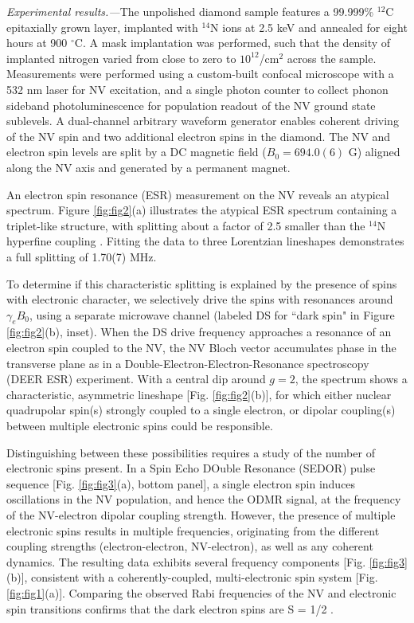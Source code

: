 \documentclass[%
 reprint,
 amsmath,amssymb,
 aps,
]{revtex4-1}
\begin{document}
\textit{Experimental results.---}The unpolished diamond sample features a 99.999\% $^{12}$C epitaxially grown layer, implanted with $^{14}$N ions at 2.5 keV and annealed for eight hours at 900 $^\circ$C. A mask implantation was performed, such that the density of implanted nitrogen varied from close to zero to $10^{12}$/cm$^2$ across the sample. Measurements were performed using a custom-built confocal microscope with a 532 nm laser for NV excitation, and a single photon counter to collect phonon sideband photoluminescence for population readout of the NV ground state sublevels. A dual-channel arbitrary waveform generator enables coherent driving of the NV spin and two additional electron spins in the diamond. The NV and electron spin levels are split by a DC magnetic field ($B_0=694.0(6)$ G) aligned along the NV axis and generated by a permanent magnet. 

An electron spin resonance (ESR) measurement on the NV reveals an atypical spectrum. Figure \ref{fig:fig2}(a) illustrates the atypical ESR spectrum containing a triplet-like structure, with splitting about a factor of 2.5 smaller than the $^{14}$N hyperfine coupling \cite{newton nv hyp}. Fitting the data to three Lorentzian lineshapes demonstrates a full splitting of 1.70(7) MHz. 

To determine if this characteristic splitting is explained by the presence of spins with electronic character, we selectively drive the spins with resonances around $\gamma_eB_0$, using a separate microwave channel (labeled DS for ``dark spin" in Figure \ref{fig:fig2}(b), inset). When the DS drive frequency approaches a resonance of an electron spin coupled to the NV, the NV Bloch vector accumulates phase in the transverse plane as in a Double-Electron-Electron-Resonance spectroscopy (DEER ESR) experiment. With a central dip around $g=2$, the spectrum shows a characteristic, asymmetric lineshape [Fig. \ref{fig:fig2}(b)], for which either nuclear quadrupolar spin(s) strongly coupled to a single electron, or dipolar coupling(s) between multiple electronic spins could be responsible. 

Distinguishing between these possibilities requires a study of the number of electronic spins present. In a Spin Echo DOuble Resonance (SEDOR) pulse sequence \cite{schweiger} [Fig. \ref{fig:fig3}(a), bottom panel], a single electron spin induces oscillations in the NV population, and hence the ODMR signal, at the frequency of the NV-electron dipolar coupling strength. However, the presence of multiple electronic spins results in multiple frequencies, originating from the different coupling strengths (electron-electron, NV-electron), as well as any coherent dynamics. The resulting data exhibits several frequency components [Fig. \ref{fig:fig3}(b)], consistent with a coherently-coupled, multi-electronic spin system [Fig. \ref{fig:fig1}(a)]. Comparing the observed Rabi frequencies of the NV and electronic spin transitions confirms that the dark electron spins are S = 1/2 \cite{suppl}.
\end{document}
